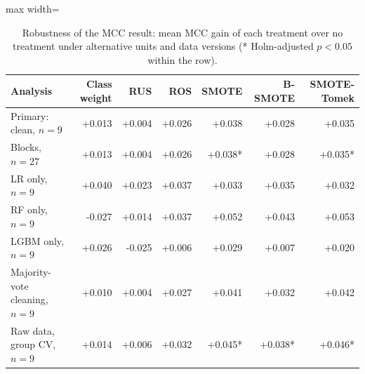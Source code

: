 \begin{table}[t]
\centering
\footnotesize
\caption{Robustness of the MCC result: mean MCC gain of each treatment over no treatment under alternative units and data versions (* Holm-adjusted $p<0.05$ within the row).}
\label{tab:robust}
\begin{adjustbox}{max width=\linewidth}
\begin{tabular}{lrrrrrr}
\toprule
Analysis & Class weight & RUS & ROS & SMOTE & B-SMOTE & SMOTE-Tomek \\
\midrule
Primary: clean, $n=9$ & +0.013 & +0.004 & +0.026 & +0.038 & +0.028 & +0.035 \\
Blocks, $n=27$ & +0.013 & +0.004 & +0.026 & +0.038* & +0.028 & +0.035* \\
LR only, $n=9$ & +0.040 & +0.023 & +0.037 & +0.033 & +0.035 & +0.032 \\
RF only, $n=9$ & -0.027 & +0.014 & +0.037 & +0.052 & +0.043 & +0.053 \\
LGBM only, $n=9$ & +0.026 & -0.025 & +0.006 & +0.029 & +0.007 & +0.020 \\
Majority-vote cleaning, $n=9$ & +0.010 & +0.004 & +0.027 & +0.041 & +0.032 & +0.042 \\
Raw data, group CV, $n=9$ & +0.014 & +0.006 & +0.032 & +0.045* & +0.038* & +0.046* \\
\bottomrule
\end{tabular}
\end{adjustbox}
\end{table}

